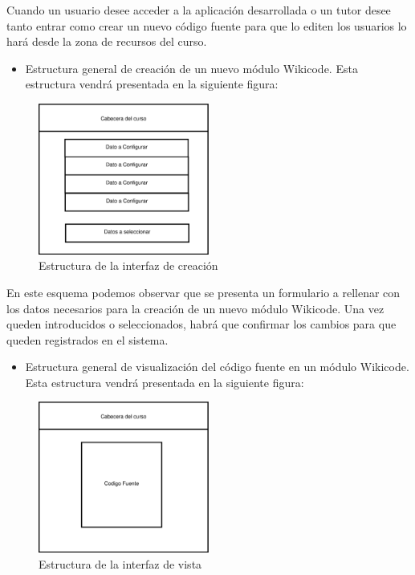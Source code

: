 Cuando un usuario desee acceder a la aplicación desarrollada o un tutor desee tanto entrar como crear un nuevo código fuente para que lo editen los usuarios lo hará desde la zona de recursos del curso.

\begin{itemize}
	\item Estructura general de creación de un nuevo módulo Wikicode. Esta estructura vendrá presentada en la siguiente figura:
\end{itemize}

\begin{figure}[h]
	\centering
	\includegraphics[width=0.5\textwidth]{./img/c3-create.eps}
	\caption{Estructura de la interfaz de creación}
\end{figure}

En este esquema podemos observar que se presenta un formulario a rellenar con los datos necesarios para la creación de un nuevo módulo Wikicode. Una vez queden introducidos o seleccionados, habrá que confirmar los cambios para que queden registrados en el sistema.

\newpage

\begin{itemize}
	\item Estructura general de visualización del código fuente en un módulo Wikicode. Esta estructura vendrá presentada en la siguiente figura:
\end{itemize}

\begin{figure}[h]
	\centering
	\includegraphics[width=0.5\textwidth]{./img/c3-view.eps}
	\caption{Estructura de la interfaz de vista}
\end{figure}

